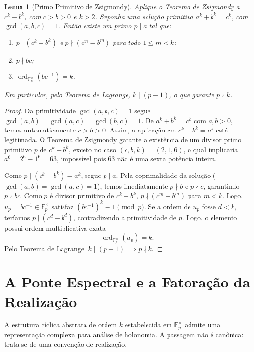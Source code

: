 \documentclass[11pt,a4paper]{article}
\newtheorem{lema}[teorema]{Lema}
\begin{document}
\begin{lema}[Primo Primitivo de Zsigmondy]
Aplique o Teorema de Zsigmondy a $c^k-b^k$, com $c>b>0$ e $k>2$. Suponha uma solução primitiva $a^k+b^k=c^k$, com $\gcd(a,b,c)=1$. Então existe um primo $p \mid a$ tal que:
\begin{enumerate}
    \item $p \mid (c^k - b^k)$ e $p \nmid (c^m - b^m)$ para todo $1 \le m < k$;
    \item $p \nmid bc$;
    \item $\operatorname{ord}_{\mathbb{F}_p^\times}(bc^{-1}) = k$.
\end{enumerate}
Em particular, pelo Teorema de Lagrange, $k \mid (p-1)$, o que garante $p \nmid k$.
\end{lema}

\begin{proof}
Da primitividade $\gcd(a,b,c)=1$ segue $\gcd(a,b)=\gcd(a,c)=\gcd(b,c)=1$. De $a^k+b^k=c^k$ com $a,b>0$, temos automaticamente $c > b > 0$. Assim, a aplicação em $c^k - b^k = a^k$ está legitimada. O Teorema de Zsigmondy garante a existência de um divisor primo primitivo $p$ de $c^k - b^k$, exceto no caso $(c,b,k)=(2,1,6)$, o qual implicaria $a^6 = 2^6 - 1^6 = 63$, impossível pois $63$ não é uma sexta potência inteira.

Como $p \mid (c^k - b^k) = a^k$, segue $p \mid a$. Pela coprimalidade da solução ($\gcd(a,b)=\gcd(a,c)=1$), temos imediatamente $p \nmid b$ e $p \nmid c$, garantindo $p \nmid bc$. Como $p$ é divisor primitivo de $c^k-b^k$, $p \nmid (c^m - b^m)$ para $m < k$. Logo, $u_p = bc^{-1} \in \mathbb{F}_p^\times$ satisfaz $(bc^{-1})^k \equiv 1 \pmod p$. Se a ordem de $u_p$ fosse $d < k$, teríamos $p \mid (c^d - b^d)$, contradizendo a primitividade de $p$. Logo, o elemento possui ordem multiplicativa exata
\[
\operatorname{ord}_{\mathbb{F}_p^\times}(u_p) = k.
\]
Pelo Teorema de Lagrange, $k \mid (p-1) \implies p \nmid k$.
\end{proof}

\section{A Ponte Espectral e a Fatoração da Realização}

A estrutura cíclica abstrata de ordem $k$ estabelecida em $\mathbb{F}_p^\times$ admite uma representação complexa para análise de holonomia. A passagem não é canônica: trata-se de uma convenção de realização.
\end{document}
